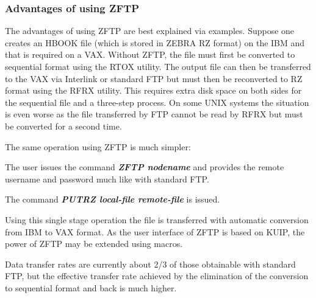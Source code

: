 \subsubsection{Advantages of using ZFTP}
\par
The advantages of using ZFTP are best explained via examples. Suppose
one creates an HBOOK file (which is stored in ZEBRA RZ format) on the
IBM and that is required on a VAX. Without ZFTP, the file must
first be converted to sequential format using the RTOX utility.
The output file can then
be transferred to the VAX via Interlink or standard FTP but must
then be reconverted to RZ format using the RFRX utility. This requires
extra disk space on both sides for the sequential file
and a three-step process.
On some UNIX systems the situation is even worse
as the file transferred by FTP cannot be read by RFRX but must
be converted for a second time.
\par
The same operation using ZFTP is much simpler:
\begin{OL}
\item
The user issues the command {\bf\it ZFTP nodename}
and provides the remote username
and password much like with standard FTP.
\item
The command {\bf\it PUTRZ local-file remote-file} is issued.
\end{OL}
\par
Using this single stage operation the file is transferred with automatic
conversion from IBM to VAX format. As the user interface of ZFTP is based
on KUIP, the power of ZFTP may be extended using macros.
\par
Data transfer rates are currently about 2/3 of those obtainable with
standard FTP, but the effective transfer rate achieved by the elimination
of the conversion to sequential format and back is much higher.
\par
